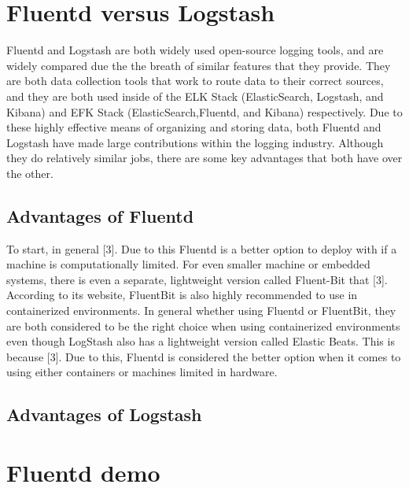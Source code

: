 \section{Fluentd versus Logstash} \label{sec:comp}
\quad \quad Fluentd and Logstash are both widely used open-source logging tools, and are widely compared due the the breath of similar features that 
they provide. They are both data collection tools that work to route data to their correct sources, and they are both used inside of the 
ELK Stack (ElasticSearch, Logstash, and Kibana) and EFK Stack (ElasticSearch,Fluentd, and Kibana) respectively. Due to these highly effective means of organizing and storing data, both 
Fluentd and Logstash have made large contributions within the logging industry. Although they do relatively similar jobs, there are some key advantages that both have over the other.
\subsection{Advantages of Fluentd}
\quad \quad To start, in general [3]. Due to this Fluentd is a better option to deploy with if a machine is
computationally limited. For even smaller machine or embedded systems, there is even a separate, lightweight version called Fluent-Bit that [3]. According to its website,
FluentBit is also highly recommended to use in containerized environments. In general whether using Fluentd or FluentBit, they are both considered to be the right choice when using containerized environments even 
though LogStash also has a lightweight version called Elastic Beats. This is because [3].
Due to this, Fluentd is considered the better option when it comes to using either containers or machines limited in hardware.
\subsection{Advantages of Logstash}
\quad \quad 
\section{Fluentd demo} \label{sec:demo}
\quad \quad 
